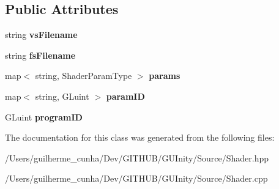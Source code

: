 \subsection*{Public Attributes}
\begin{DoxyCompactItemize}
\item 
\hypertarget{class_shader_af5c648f5ea74908dd3ad9aae91d0e61a}{}string {\bfseries vs\+Filename}\label{class_shader_af5c648f5ea74908dd3ad9aae91d0e61a}

\item 
\hypertarget{class_shader_a0eb039600af333cc4c4e424dbc5c2068}{}string {\bfseries fs\+Filename}\label{class_shader_a0eb039600af333cc4c4e424dbc5c2068}

\item 
\hypertarget{class_shader_ac693a3dd588572cc848e109f15418268}{}map$<$ string, Shader\+Param\+Type $>$ {\bfseries params}\label{class_shader_ac693a3dd588572cc848e109f15418268}

\item 
\hypertarget{class_shader_aff452b0d16cca218ca27fbb46d5139a6}{}map$<$ string, G\+Luint $>$ {\bfseries param\+I\+D}\label{class_shader_aff452b0d16cca218ca27fbb46d5139a6}

\item 
\hypertarget{class_shader_afce507f5013e82f7a62b47bbfb2fb048}{}G\+Luint {\bfseries program\+I\+D}\label{class_shader_afce507f5013e82f7a62b47bbfb2fb048}

\end{DoxyCompactItemize}


The documentation for this class was generated from the following files\+:\begin{DoxyCompactItemize}
\item 
/\+Users/guilherme\+\_\+cunha/\+Dev/\+G\+I\+T\+H\+U\+B/\+G\+U\+Inity/\+Source/Shader.\+hpp\item 
/\+Users/guilherme\+\_\+cunha/\+Dev/\+G\+I\+T\+H\+U\+B/\+G\+U\+Inity/\+Source/Shader.\+cpp\end{DoxyCompactItemize}
